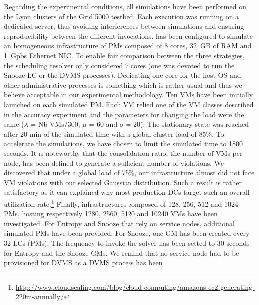 Regarding the experimental conditions, all simulations have been
performed on the Lyon clusters of the Grid'5000 testbed.
Each execution was running on a dedicated server, thus avoiding
interferences between simulations and ensuring reproducibility between
the different invocations.
%
\vmps has been configured to simulate an homogeneous
infrastructure of PMs composed of 8 cores, 32~GB of RAM and 1~Gpbs
Ethernet NIC. To enable fair comparison between the three strategies,
the scheduling resolver only considered 7 cores (\ie one was devoted
to run the Snooze LC or the DVMS processes). Dedicating one core for
the host OS and other administrative processes is something which is
rather usual and thus we believe acceptable in our experimental
methodology.  Ten VMs have been
initially launched on each simulated PM. Each VM relied one of the VM
classes described in the accuracy experiment and the
parameters for changing the load were the same ($\lambda$ = Nb
VMs/300, $\mu$ = 60 and $\sigma$ = 20). The stationary state was
reached after 20 min of the simulated time with a global cluster load
of 85\%.
To accelerate the simulations, we have chosen to limit the simulated time to 1800
seconds. It is noteworthy that the consolidation ratio, \ie the number
of VMs per node, has been defined to generate a sufficient number of
violations. We discovered that under a global load of 75\%, our
infrastructure almost did not face VM violations with our selected Gaussian
distribution. Such a result is rather
satisfactory as it can explained why most production DCs target such
an overall utilization rate.\footnote{\url{http://www.cloudscaling.com/blog/cloud-computing/amazons-ec2-generating-220m-annually/}}
Finally, infrastructures composed of
128, 256, 512 and 1024 PMs, hosting respectively 1280, 2560, 5120 and
10240 VMs have been investigated. For Entropy and Snooze that rely on
service nodes, additional simulated PMs have been provided. For Snooze, one GM
has been created every 32 LCs (\ie PMs). The frequency to invoke the
solver has been setted to 30 seconds for Entropy and the Snooze GMs.
We remind that no service
node had to be provisioned for DVMS as a DVMS process has been
